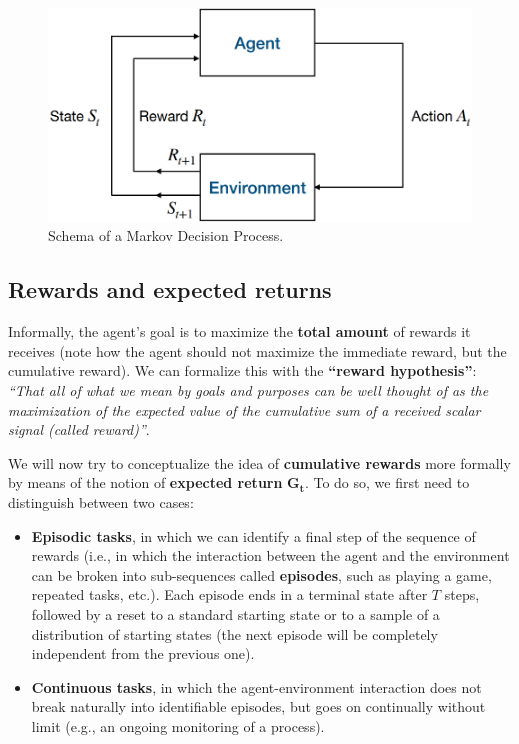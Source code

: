 \begin{figure}[hbt]
    \centering
    \includegraphics[width=\textwidth]{Images/Chapter 2/mdp.png}
    \caption{Schema of a Markov Decision Process.}
    \label{fig:ch2-mdp}
\end{figure}

\subsection{Rewards and expected returns}
Informally, the agent’s goal is to maximize the \textbf{total amount} of rewards it receives (note how the agent should not maximize the immediate reward, but the cumulative reward). We can formalize this with the \textbf{``reward hypothesis''}: \textit{``That all of what we mean by goals and purposes can be well thought of as the maximization of the expected value of the cumulative sum of a received scalar signal (called reward)''}.

We will now try to conceptualize the idea of \textbf{cumulative rewards} more formally by means of the notion of \textbf{expected return} $\boldsymbol{G_t}$. To do so, we first need to distinguish between two cases:

\begin{itemize}
    \item \textbf{Episodic tasks}, in which we can identify a final step of the sequence of rewards (i.e., in which the interaction between the agent and the environment can be broken into sub-sequences called \textbf{episodes}, such as playing a game, repeated tasks, etc.). Each episode ends in a terminal state after $T$ steps, followed by a reset to a standard starting state or to a sample of a distribution of starting states (the next episode will be completely independent from the previous one).
    \item \textbf{Continuous tasks}, in which the agent-environment interaction does not break naturally into identifiable episodes, but goes on continually without limit (e.g., an ongoing monitoring of a process).
\end{itemize}

